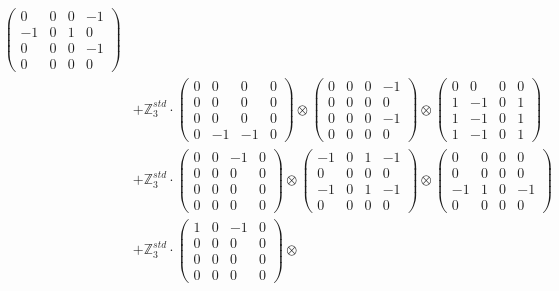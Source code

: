 \documentclass{article}
\begin{document}
{\begin{align}
        \begin{pmatrix} 0 & 0 & 0 & -1 \\ -1 & 0 & 1 & 0 \\ 0 & 0 & 0 & -1 \\ 0 & 0 & 0 & 0 \end{pmatrix} \\ 
    &+ \label{Rs12-Rc12-Solution-Transformed-c18} \mathbb{Z}_3^{std} \cdot 
        \begin{pmatrix} 0 & 0 & 0 & 0 \\ 0 & 0 & 0 & 0 \\ 0 & 0 & 0 & 0 \\ 0 & -1 & -1 & 0 \end{pmatrix} \otimes 
        \begin{pmatrix} 0 & 0 & 0 & -1 \\ 0 & 0 & 0 & 0 \\ 0 & 0 & 0 & -1 \\ 0 & 0 & 0 & 0 \end{pmatrix} \otimes 
        \begin{pmatrix} 0 & 0 & 0 & 0 \\ 1 & -1 & 0 & 1 \\ 1 & -1 & 0 & 1 \\ 1 & -1 & 0 & 1 \end{pmatrix} \\ 
    &+ \label{Rs12-Rc12-Solution-Transformed-c19} \mathbb{Z}_3^{std} \cdot 
        \begin{pmatrix} 0 & 0 & -1 & 0 \\ 0 & 0 & 0 & 0 \\ 0 & 0 & 0 & 0 \\ 0 & 0 & 0 & 0 \end{pmatrix} \otimes 
        \begin{pmatrix} -1 & 0 & 1 & -1 \\ 0 & 0 & 0 & 0 \\ -1 & 0 & 1 & -1 \\ 0 & 0 & 0 & 0 \end{pmatrix} \otimes 
        \begin{pmatrix} 0 & 0 & 0 & 0 \\ 0 & 0 & 0 & 0 \\ -1 & 1 & 0 & -1 \\ 0 & 0 & 0 & 0 \end{pmatrix} \\ 
    &+ \label{Rs12-Rc12-Solution-Transformed-c20} \mathbb{Z}_3^{std} \cdot 
        \begin{pmatrix} 1 & 0 & -1 & 0 \\ 0 & 0 & 0 & 0 \\ 0 & 0 & 0 & 0 \\ 0 & 0 & 0 & 0 \end{pmatrix} \otimes 

\end{align}}
\end{document}
